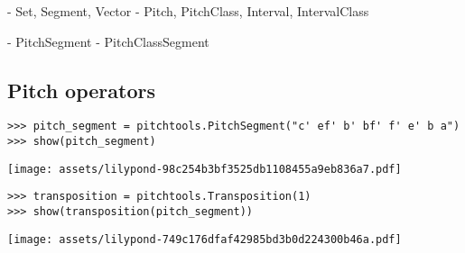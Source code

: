 \begin{markdown}
- Set, Segment, Vector
- Pitch, PitchClass, Interval, IntervalClass
\end{markdown}

\begin{markdown}
- PitchSegment
- PitchClassSegment
\end{markdown}

\subsection{Pitch operators}
\label{ssec:pitch-operators}

\begin{comment}
<abjad>
pitch_segment = pitchtools.PitchSegment("c' ef' b' bf' f' e' b a")
show(pitch_segment)
</abjad>
\end{comment}

\begin{abjadbookoutput}
\begin{singlespacing}
\vspace{-0.5\baselineskip}
\begin{lstlisting}
>>> pitch_segment = pitchtools.PitchSegment("c' ef' b' bf' f' e' b a")
>>> show(pitch_segment)
\end{lstlisting}
\noindent\texttt{[image: assets/lilypond-98c254b3bf3525db1108455a9eb836a7.pdf]}
\end{singlespacing}
\end{abjadbookoutput}

\begin{comment}
<abjad>
transposition = pitchtools.Transposition(1)
show(transposition(pitch_segment))
</abjad>
\end{comment}

\begin{abjadbookoutput}
\begin{singlespacing}
\vspace{-0.5\baselineskip}
\begin{lstlisting}
>>> transposition = pitchtools.Transposition(1)
>>> show(transposition(pitch_segment))
\end{lstlisting}
\noindent\texttt{[image: assets/lilypond-749c176dfaf42985bd3b0d224300b46a.pdf]}
\end{singlespacing}
\end{abjadbookoutput}

\begin{comment}
<abjad>
inversion = pitchtools.Inversion()
show(inversion(pitch_segment))
inversion_with_axis = pitchtools.Inversion(axis=NamedPitch("d'"))
show(inversion_with_axis(pitch_segment))
</abjad>
\end{comment}

